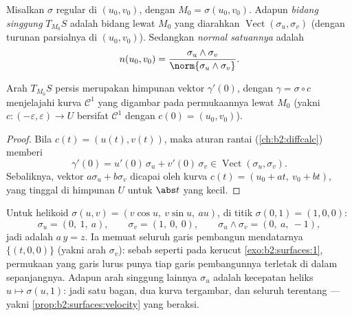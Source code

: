 \begin{definition}\label{def:b2:surfaces:tangent}
Misalkan $\sigma$ regular di $(u_0, v_0)$, dengan $M_0 = \sigma(u_0, v_0)$.
Adapun \emph{bidang singgung} $T_{M_0}S$ adalah bidang lewat $M_0$
yang diarahkan $\operatorname{Vect}(\sigma_u, \sigma_v)$ (dengan turunan parsialnya di
$(u_0, v_0)$). Sedangkan \emph{normal satuannya} adalah
\[
n(u_0, v_0)
= \frac{\sigma_u \wedge \sigma_v}
       {\norm{\sigma_u \wedge \sigma_v}} .
\]
\end{definition}

\begin{proposition}\label{prop:b2:surfaces:velocity}
Arah $T_{M_0}S$ persis merupakan himpunan vektor
$\gamma'(0)$, dengan $\gamma = \sigma \circ c$ menjelajahi
kurva $\mathcal{C}^1$ yang digambar pada permukaannya lewat $M_0$ (yakni
$c \colon (-\varepsilon, \varepsilon) \to U$ bersifat $\mathcal{C}^1$
dengan $c(0) = (u_0, v_0)$).
\end{proposition}

\begin{proof}
Bila $c(t) = (u(t), v(t))$, maka aturan rantai
(\cref{ch:b2:diffcalc}) memberi
\[
\gamma'(0) = u'(0)\,\sigma_u + v'(0)\,\sigma_v
\in \operatorname{Vect}(\sigma_u, \sigma_v).
\]
Sebaliknya, vektor $a\sigma_u + b\sigma_v$ dicapai oleh
kurva $c(t) = (u_0 + at,\ v_0 + bt)$, yang tinggal di himpunan 
$U$ untuk $\abs t$ yang kecil.
\end{proof}

\begin{example}
\label{ex:b2:surfaces:helicoidtangent}
Untuk helikoid $\sigma(u, v) = (v\cos u,\ v\sin u,\ au)$,
di titik $\sigma(0, 1) = (1, 0, 0)$:
\[
\sigma_u = (0,\ 1,\ a), \qquad \sigma_v = (1,\ 0,\ 0),
\qquad
\sigma_u \wedge \sigma_v = (0,\ a,\ -1),
\]
jadi  adalah $a\,y = z$. Ia memuat seluruh
garis pembangun mendatarnya $\{(t, 0, 0)\}$ (yakni arah $\sigma_v$): sebab
seperti pada kerucut \cref{exo:b2:surfaces:1}, permukaan yang 
garis lurus punya tiap garis pembangunnya terletak di dalam  sepanjangnya. Adapun arah singgung lainnya $\sigma_u$ adalah
kecepatan heliks $u \mapsto \sigma(u, 1)$: jadi satu bagan,
dua kurva tergambar, dan seluruh  terentang ---
yakni \cref{prop:b2:surfaces:velocity} yang beraksi.
\end{example}

